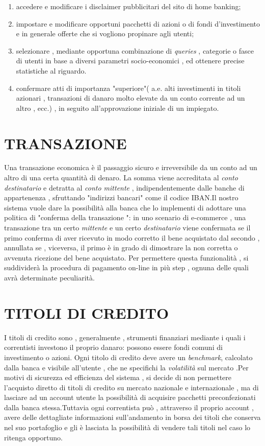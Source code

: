 {{{{\begin{enumerate}
	\item accedere e modificare i disclaimer pubblicitari del sito di home banking;
	\item impostare e modificare opportuni pacchetti di azioni o di fondi d'investimento e in generale offerte che si vogliono propinare agli utenti;
	\item selezionare , mediante opportuna combinazione di \emph{queries} , categorie o fasce di utenti in base a diversi parametri socio-economici , ed ottenere precise statistiche al riguardo.
	\item confermare atti di importanza "superiore"( a.e. alti investimenti in titoli azionari , transazioni di danaro molto elevate da un conto corrente ad un altro , ecc.) , in seguito all'approvazione iniziale di un impiegato.
	\end{enumerate}




\section{TRANSAZIONE}
Una transazione economica è il passaggio sicuro e irreversibile da un conto ad un altro di una certa quantità di denaro. La somma viene accreditata al \emph{conto destinatario} e detratta al \emph{conto mittente} , indipendentemente dalle banche di appartenenza , sfruttando "indirizzi bancari" come il codice IBAN.Il nostro sistema vuole dare la possibilità alla banca che lo implementi di adottare una politica di "conferma della transazione ": in uno scenario di e-commerce , una transazione tra un certo \emph{mittente} e un certo \emph{destinatario} viene confermata se il primo conferma di aver ricevuto in modo corretto il bene acquistato dal secondo , annullata se , viceversa, il primo è in grado di dimostrare la non corretta o avvenuta ricezione del bene acquistato. Per permettere questa funzionalità , si suddividerà la procedura di pagamento on-line in più step , ognuna delle quali avrà determinate peculiarità.

\section{ TITOLI DI CREDITO}
I titoli di credito sono , generalmente , strumenti finanziari mediante i quali i correntisti investono il proprio danaro: possono essere fondi comuni di investimento o azioni. Ogni titolo di credito deve avere un \emph{benchmark}, calcolato dalla banca e visibile all'utente , che ne specifichi la \emph{volatilità} sul mercato .Per motivi di sicurezza ed efficienza del sistema , si decide di non permettere l'acquisto diretto di titoli di credito su mercato nazionale e internazionale , ma di lasciare ad un account utente la possibilità di acquisire pacchetti preconfezionati dalla banca stessa.Tuttavia ogni correntista può , attraverso il proprio account , avere delle dettagliate informazioni sull'andamento in borsa dei titoli che conserva nel suo portafoglio  e gli è lasciata la possibilità di vendere tali titoli nel caso lo ritenga opportuno.


}}}}

